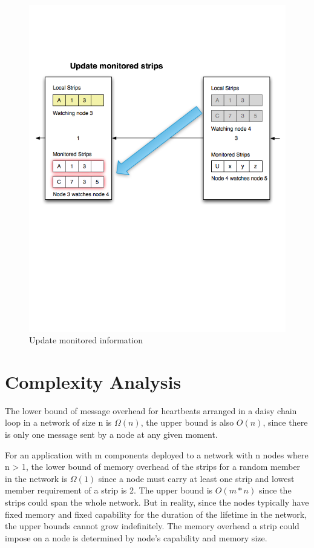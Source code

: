 \begin{figure}[h!]
\caption{Update monitored information}
\label{fig:strip10}
\centering
    \includegraphics[width=\linewidth]{figures/strip10}
\end{figure}

\section{Complexity Analysis}

The lower bound of message overhead for heartbeats arranged in a daisy chain
loop in a network of size n is $\Omega(n)$, the upper bound is also $O(n)$, since
there is only one message sent by a node at any given moment.

For an application with m components deployed to a network with n nodes where
n > 1, the lower bound of memory overhead of the strips for a random member in
the network is $\Omega(1)$ since a node must carry at least one strip and lowest
member requirement of a strip is 2. The upper bound is $O(m*n)$ since the strips
could span the whole network. But in reality, since the nodes typically have
fixed memory and fixed capability for the duration of the lifetime in the
network, the upper bounds cannot grow indefinitely. The memory overhead a strip
could impose on a node is determined by node's capability and memory size.


